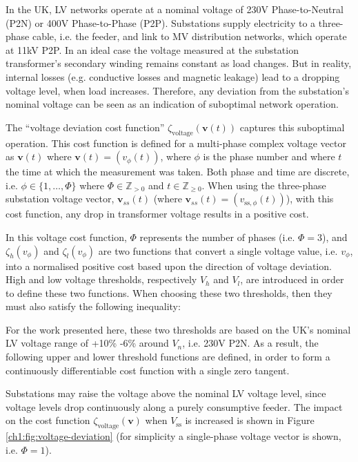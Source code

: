 In the UK, LV networks operate at a nominal voltage of 230V Phase-to-Neutral (P2N) or 400V Phase-to-Phase (P2P).
Substations supply electricity to a three-phase cable, i.e. the feeder, and  link to MV distribution networks, which operate at 11kV P2P.
In an ideal case the voltage measured at the substation transformer's secondary winding remains constant as load changes.
But in reality, internal losses (e.g. conductive losses and magnetic leakage) lead to a dropping voltage level, when load increases.
Therefore, any deviation from the substation's nominal voltage can be seen as an indication of suboptimal network operation.

The ``voltage deviation cost function'' $\zeta_\text{voltage}(\textbf{v}(t))$ captures this suboptimal operation.
This cost function is defined for a multi-phase complex voltage vector as $\textbf{v}(t)$ where $\textbf{v}(t) = (v_\phi(t))$, where $\phi$ is the phase number and where $t$ the time at which the measurement was taken.
Both phase and time are discrete, i.e. $\phi \in \{1,\dots,\Phi\}$ where $\Phi \in \mathbb{Z}_{>0}$ and $t \in \mathbb{Z}_{\geq0}$.
When using the three-phase substation voltage vector, $\textbf{v}_{ss}(t)$ (where $\textbf{v}_{ss}(t) = (v_{\text{ss},\phi}(t))$), with this cost function, any drop in transformer voltage results in a positive cost.



In this voltage cost function, $\Phi$ represents the number of phases (i.e. $\Phi = 3$), and $\zeta_h(v_\phi)$ and $\zeta_l(v_\phi)$ are two functions that convert a single voltage value, i.e. $v_\phi$, into a normalised positive cost based upon the direction of voltage deviation.
High and low voltage thresholds, respectively $V_h$ and $V_l$, are introduced in order to define these two functions.
When choosing these two thresholds, then they must also satisfy the following inequality:



For the work presented here, these two thresholds are based on the UK's nominal LV voltage range of +10\% -6\% around $V_n$, i.e. 230V P2N.
As a result, the following upper and lower threshold functions are defined, in order to form a continuously differentiable cost function with a single zero tangent.



Substations may raise the voltage above the nominal LV voltage level, since voltage levels drop continuously along a purely consumptive feeder.
The impact on the cost function $\zeta_\text{voltage}(\textbf{v})$ when $V_\text{ss}$ is increased is shown in Figure \ref{ch1:fig:voltage-deviation} (for simplicity a single-phase voltage vector is shown, i.e. $\Phi = 1$).


